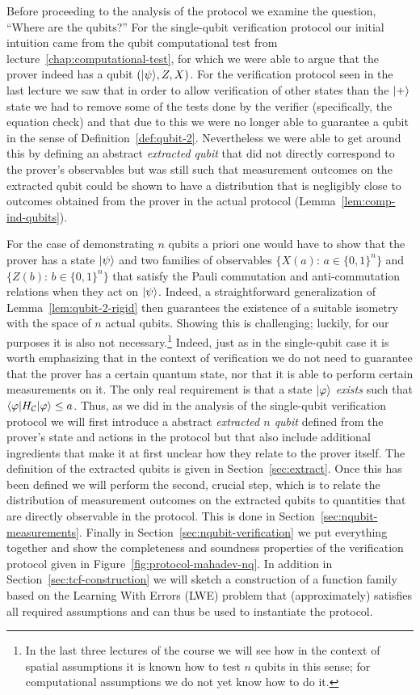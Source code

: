 Before proceeding to the analysis of the protocol we examine the question, ``Where are the qubits?'' For the single-qubit verification protocol our initial intuition came from the qubit computational test from lecture~\ref{chap:computational-test}, for which we were able to argue that the prover indeed has a qubit $(|\psi\rangle,Z,X)$. For the verification protocol seen in the last lecture we saw that in order to allow verification of other states than the $|+\rangle$ state we had to remove some of the tests done by the verifier (specifically, the equation check) and that due to this we were no longer able to guarantee a qubit in the sense of Definition~\ref{def:qubit-2}. Nevertheless we were able to get around this by defining an abstract \emph{extracted qubit} that did not directly correspond to the prover's observables but was still such that measurement outcomes on the extracted qubit could be shown to have a distribution that is negligibly close to outcomes obtained from the prover in the actual protocol (Lemma~\ref{lem:comp-ind-qubits}). 

For the case of demonstrating $n$ qubits a priori one would have to show that the prover has a state $|\psi\rangle$ and two families of observables $\{X(a):\, a\in\{0,1\}^n\}$ and $\{Z(b):\,b\in\{0,1\}^n\}$ that satisfy the Pauli commutation and anti-commutation relations when they act on $|\psi\rangle$. Indeed, a straightforward generalization of Lemma~\ref{lem:qubit-2-rigid} then guarantees the existence of a suitable isometry with the space of $n$ actual qubits. 
Showing this is challenging; luckily, for our purposes it is also not necessary.\footnote{In the last three lectures of the course we will see how in the context of spatial assumptions it is known how to test $n$ qubits in this sense; for computational assumptions we do not yet know how to do it.} Indeed, just as in the single-qubit case it is worth emphasizing that in the context of verification we do not need to guarantee that the prover has a certain quantum state, nor that it is able to perform certain measurements on it. The only real requirement is that a state $|\varphi\rangle$ \emph{exists} such that $\langle\varphi| H_{\mathcal{C}} |\varphi\rangle \leq a$. Thus, as we did in the analysis of the single-qubit verification protocol we will first introduce a abstract \emph{extracted $n$ qubit} defined from the prover's state and actions in the protocol but that also include additional ingredients that make it at first unclear how they relate to the prover itself. The definition of the extracted qubits is given in Section~\ref{sec:extract}. Once this has been defined we will perform the second, crucial step, which is to relate the distribution of measurement outcomes on the extracted qubits to quantities that are directly observable in the protocol. This is done in Section~\ref{sec:nqubit-measurements}. Finally in Section~\ref{sec:nqubit-verification} we put everything together and show the completeness and soundness properties of the verification protocol given in Figure~\ref{fig:protocol-mahadev-nq}. In addition in Section~\ref{sec:tcf-construction} we will sketch a construction of a function family based on the Learning With Errors (LWE) problem that (approximately) satisfies all required assumptions  and can thus be used to instantiate the protocol. 


